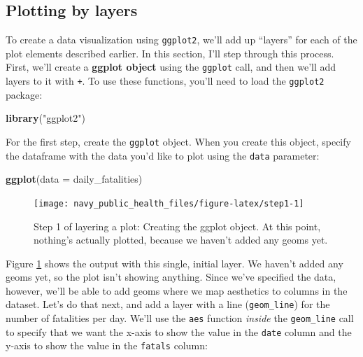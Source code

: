\documentclass[]{tufte-book}
\newenvironment{Shaded}{}{}
\newcommand{\DataTypeTok}[1]{\textcolor[rgb]{0.56,0.13,0.00}{#1}}
\newcommand{\KeywordTok}[1]{\textcolor[rgb]{0.00,0.44,0.13}{\textbf{#1}}}
\newcommand{\NormalTok}[1]{#1}
\newcommand{\StringTok}[1]{\textcolor[rgb]{0.25,0.44,0.63}{#1}}
\begin{document}
\hypertarget{plotting-by-layers}{%
\subsection{Plotting by layers}\label{plotting-by-layers}}

To create a data visualization using \texttt{ggplot2}, we'll add up ``layers'' for each of
the plot elements described earlier. In this section, I'll step through this process.
First, we'll create a \textbf{ggplot object} using the \texttt{ggplot} call, and then we'll add
layers to it with \texttt{+}. To use these functions, you'll need to load the \texttt{ggplot2}
package:

\begin{Shaded}
\begin{Highlighting}[]
\KeywordTok{library}\NormalTok{(}\StringTok{"ggplot2"}\NormalTok{)}
\end{Highlighting}
\end{Shaded}

For the first step, create the \texttt{ggplot} object. When you create this object, specify
the dataframe with the data you'd like to plot using the \texttt{data} parameter:

\begin{Shaded}
\begin{Highlighting}[]
\KeywordTok{ggplot}\NormalTok{(}\DataTypeTok{data =}\NormalTok{ daily_fatalities)}
\end{Highlighting}
\end{Shaded}

\begin{figure}
\texttt{[image: navy\_public\_health\_files/figure-latex/step1-1]} \caption[Step 1 of layering a plot]{Step 1 of layering a plot: Creating the ggplot object. At this point, nothing's actually plotted, because we haven't added any geoms yet.}\label{fig:step1}
\end{figure}

Figure \ref{fig:step1} shows the output with this single, initial layer. We haven't added any geoms yet, so the plot isn't showing anything. Since we've specified the
data, however, we'll be able to add geoms where we map aesthetics to columns in the
dataset. Let's do that next, and add a layer with a line (\texttt{geom\_line}) for the number
of fatalities per day. We'll use the \texttt{aes} function \emph{inside} the \texttt{geom\_line} call
to specify that we want the x-axis to show the value in the \texttt{date} column and the
y-axis to show the value in the \texttt{fatals} column:
\end{document}
